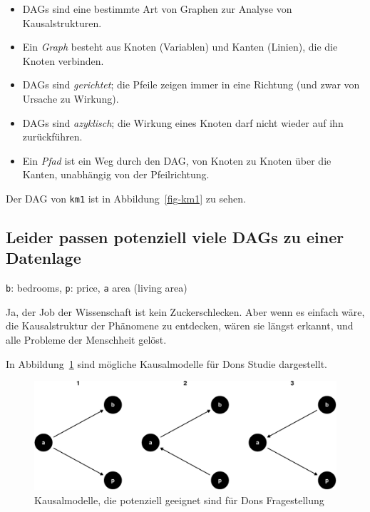 \documentclass[
  a4paper,
  DIV=11]{scrreprt}
\theoremstyle{definition}
\theoremstyle{remark}
\begin{document}
\begin{itemize}
\item
  DAGs sind eine bestimmte Art von Graphen zur Analyse von
  Kausalstrukturen.
\item
  Ein \emph{Graph} besteht aus Knoten (Variablen) und Kanten (Linien),
  die die Knoten verbinden.
\item
  DAGs sind \emph{gerichtet}; die Pfeile zeigen immer in eine Richtung
  (und zwar von Ursache zu Wirkung).
\item
  DAGs sind \emph{azyklisch}; die Wirkung eines Knoten darf nicht wieder
  auf ihn zurückführen.
\item
  Ein \emph{Pfad} ist ein Weg durch den DAG, von Knoten zu Knoten über
  die Kanten, unabhängig von der Pfeilrichtung.
\end{itemize}

Der DAG von \texttt{km1} ist in Abbildung~\ref{fig-km1} zu sehen.

\hypertarget{leider-passen-potenziell-viele-dags-zu-einer-datenlage}{%
\subsection{Leider passen potenziell viele DAGs zu einer
Datenlage}\label{leider-passen-potenziell-viele-dags-zu-einer-datenlage}}

\texttt{b}: bedrooms, \texttt{p}: price, \texttt{a} area (living area)

Ja, der Job der Wissenschaft ist kein Zuckerschlecken. Aber wenn es
einfach wäre, die Kausalstruktur der Phänomene zu entdecken, wären sie
längst erkannt, und alle Probleme der Menschheit gelöst.

In Abbildung~\ref{fig-kms} sind mögliche Kausalmodelle für Dons Studie
dargestellt.

\begin{figure}

{\centering \includegraphics{./kausal_files/figure-pdf/fig-kms-1.pdf}

}

\caption{\label{fig-kms}Kausalmodelle, die potenziell geeignet sind für
Dons Fragestellung}

\end{figure}
\end{document}
